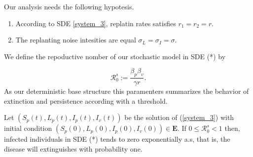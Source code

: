 Our analysis needs the following hypotesis.
\begin{enumerate}[(H-1)]
	\item
	 	According to SDE \eqref{system_3}, replatin rates satisfies 
	  	$r_1=r_2 = r$. 
	\item
		The replanting noise intesities are equal
	  	$\sigma_L = \sigma_I = \sigma$.
\end{enumerate}
%


We define the repoductive nomber of our stochastic model in SDE (*) by

\begin{equation}
	\label{eq5}
	\mathcal{R}_0^s :=\frac{\beta_p\beta_v}{\gamma r}.
\end{equation}
As our deterministic base structure this paramenters summarizes the behavior of 
extinction and persistence according with a threshold.



\begin{theorem}\label{theorem_2}
	Let $(S_p(t),L_p(t),I_p(t),I_v(t))$ be the solution of 
	(\ref{system_3}) 
	with initial condition $(S_p(0),L_p(0),I_p(0),I_v(0))\in \mathbf{E}$.
	If $0 \leq \mathcal{R}_0 ^ s < 1$  then, infected individuals 
	in SDE (*) tends to zero exponentially a.s, that is,
	the disease will extinguishes with probability one.
\end{theorem}


